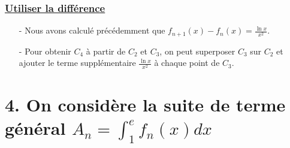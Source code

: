 \documentclass[12pt]{article}
\begin{document}
\begin{enumerate}
\subsubsection*{\underline{ Utiliser la différence }}
\begin{itemize}
    \item[-] Nous avons calculé précédemment que \( f_{n+1}(x) - f_n(x) = \frac{\ln x}{x^2} \).
    \item[-] Pour obtenir \( C_4 \) à partir de \( C_2 \) et \( C_3 \), on peut superposer \( C_3 \) sur \( C_2 \) et ajouter le terme supplémentaire \(\frac{\ln x}{x^2}\) à chaque point de \( C_3 \).
\end{itemize}

\end{enumerate}
\section*{4. On considère la suite de terme général $A_{n}=\int_{1}^{e}f_{n}(x)dx$}
\end{document}
